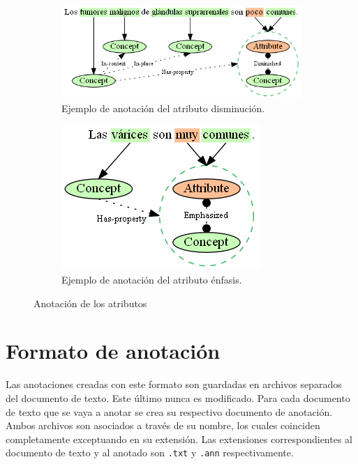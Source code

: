 \begin{figure}[H]
	\begin{subfigure}{4.2in}
		\includegraphics[width=\linewidth]{graphics/annotation_example_attribute_diminished.png}
		\caption{Ejemplo de anotación del atributo disminución.}
		\vspace{0.3in}
		\label{fig:annotation_example_attribute_diminished}
	\end{subfigure}
	\begin{subfigure}{2.3in}
		\includegraphics[width=\linewidth]{graphics/annotation_example_attribute_emphasized.png}
		\caption{Ejemplo de anotación del atributo énfasis.}
		\label{fig:annotation_example_attribute_emphasized}
	\end{subfigure}
	\caption{Anotación de los atributos}
	\label{fig:annotation_examples_attributes}
\end{figure}

\section{Formato de anotación}
Las anotaciones creadas con este formato son guardadas en archivos separados del documento de texto. Este último nunca es modificado. Para cada documento de texto que se vaya a anotar se crea su respectivo documento de anotación. Ambos archivos son asociados a través de su nombre, los cuales coinciden completamente exceptuando en su extensión. Las extensiones correspondientes al documento de texto y al anotado son \texttt{.txt} y \texttt{.ann} respectivamente.

